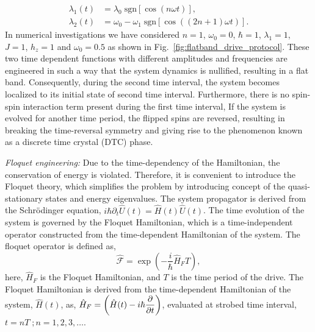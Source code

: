 \documentclass[%
reprint,
superscriptaddress,
amsmath,amssymb,
aps,
prb,
showkeys,
]{revtex4-2}
\begin{document}
\begin{align}
    \lambda_1(t) &= \lambda_0 \;\mathrm{sgn}[\cos(n\omega t)],\\
    \lambda_2(t) &= \omega_0 - \omega_1 \;\mathrm{sgn}[\cos((2n+1)\omega t)].
\end{align}
 In numerical investigations we have considered $n=1$, $\omega_0 = 0$, $\hbar =1$, $\lambda_1 = 1$, $J=1$, $h_z=1$ and $\omega_0 = 0.5$ as shown in Fig.~\ref{fig:flatband_drive_protocol}.
These two time dependent functions with different amplitudes and frequencies are engineered in such a way that the system dynamics is nullified, resulting in a flat band. Consequently, during the second time interval, the system becomes localized to its initial state of second time interval. Furthermore, there is no spin-spin interaction term present during the first time interval,  If the system is evolved for another time period, the flipped spins are reversed, resulting in breaking the time-reversal symmetry and giving rise to the phenomenon known as a discrete time crystal (DTC) phase.

\textit{Floquet engineering:} Due to the time-dependency of the Hamiltonian, the conservation of energy is violated. Therefore, it is convenient to introduce the Floquet theory, which simplifies the problem by introducing concept of the  quasi-stationary states and energy eigenvalues. The system propagator is derived from the Schr\"odinger equation, $\displaystyle i \hbar \partial_t \hat{U}(t) = \hat{H}(t) \hat{U}(t)$. The time evolution of the system is governed by the Floquet Hamiltonian, which is a time-independent operator constructed from the time-dependent Hamiltonian of the system.
The floquet operator is defined as,
\begin{equation}
    \hat{\mathcal{F}} = \exp(-\frac{i}{\hbar}\hat{H}_F T),
\end{equation}
here, $\hat{H}_F$ is the Floquet Hamiltonian, and $T$ is the time period of the drive. The Floquet Hamiltonian is derived from the time-dependent Hamiltonian of the system, $\hat{H}(t)$, as, $\displaystyle  \hat{H}_F = \left(\hat{H}(t) -i\hbar \partialderivative{t}\right)$, evaluated at strobed time interval, $t=nT\; ;n=1,2,3,\dots$.
\end{document}
